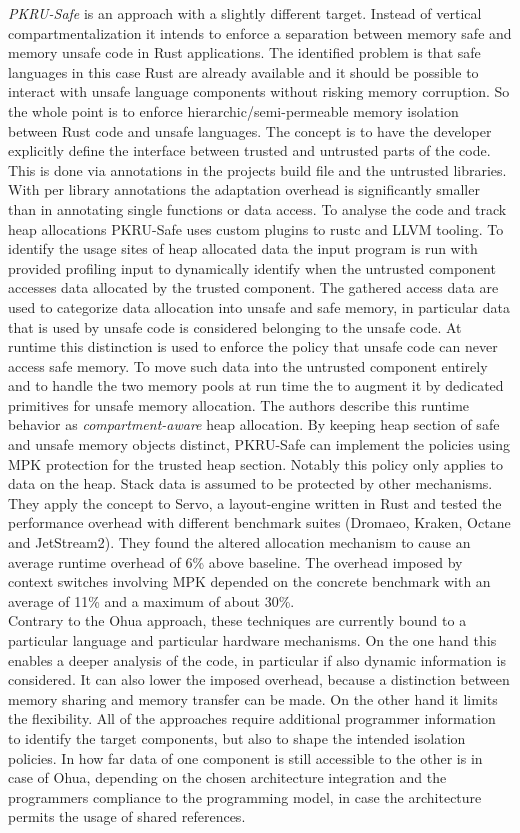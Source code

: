  \emph{PKRU-Safe}\cite{kirth2022pkru} is an approach with a slightly different target. Instead of vertical compartmentalization it intends to enforce a separation between memory safe and memory unsafe code in Rust applications. The identified problem is that safe languages in this case Rust are already available and it should be possible to interact with unsafe language components without risking memory corruption. So the whole point is to enforce hierarchic/semi-permeable memory isolation between Rust code and unsafe languages. The concept is to have the developer explicitly define the interface between trusted and untrusted parts of the code. This is done via annotations in the projects build file and the untrusted libraries. With per library annotations the adaptation overhead is significantly smaller than in annotating single functions or data access. To analyse the code and track heap allocations PKRU-Safe uses custom plugins to rustc and LLVM tooling. To identify the usage sites of heap allocated data the input program is run with provided profiling input to dynamically identify when the untrusted component accesses data allocated by the trusted component. The gathered access data are used to categorize data allocation into unsafe and safe memory, in particular data that is used by unsafe code is considered belonging to the unsafe code. At runtime this distinction is used to enforce the policy that unsafe code can never access safe memory. To move such data into the untrusted component entirely and to handle the two memory pools at run time the  to augment it by dedicated primitives for unsafe memory allocation. The authors describe this runtime behavior as \emph{compartment-aware} heap allocation. By keeping heap section of safe and unsafe memory objects distinct, PKRU-Safe can implement the policies using MPK protection for the trusted heap section. Notably this policy only applies to data on the heap. Stack data is assumed to be protected by other mechanisms. They apply the concept to Servo, a layout-engine written in Rust and tested the performance overhead with different benchmark suites (Dromaeo, Kraken, Octane and JetStream2). They found the altered allocation mechanism to cause an average runtime overhead of 6\% above baseline. The overhead imposed by context switches  involving MPK depended on the concrete benchmark with an average of 11\% and a maximum of about 30\%. \\

Contrary to the Ohua approach, these techniques are currently bound to a particular language and particular hardware mechanisms. On the one hand this enables a deeper analysis of the code, in particular if also dynamic information is considered. It can also lower the imposed overhead, because a distinction between memory sharing and memory transfer can be made. On the other hand it limits the flexibility. All of the approaches require additional programmer information to identify the target components, but also to shape the intended isolation policies. In how far data of one component is still accessible to the other is in case of Ohua, depending on the chosen architecture integration and the programmers compliance to the programming model, in case the architecture permits the usage of shared references. 
